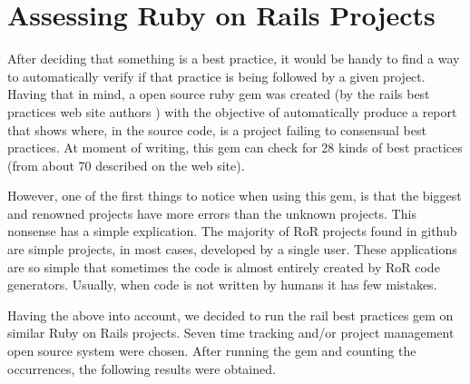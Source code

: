 \documentclass[sle]{llncs}
\begin{document}
\section{Assessing Ruby on Rails Projects}
After deciding that something is a best practice,
it would be handy to find a way to automatically verify if that practice is being followed by a given project.
Having that in mind, a open source ruby gem was created (by the rails best practices web site authors ) with the objective of automatically produce a report that shows where, 
in the source code, is a project failing to consensual best practices.
At moment of writing, this gem can check for 28 kinds of best practices (from about 70 described on the web site).

However, one of the first things to notice when using this gem,
is that the biggest and renowned projects have more errors than the unknown projects. 
This nonsense has a simple explication.
The majority of RoR projects found in github are simple projects, in most cases, developed by a single user. 
These applications are so simple that sometimes the code is almost entirely created by RoR code generators.
Usually, when code is not written by humans it has few mistakes.

Having the above into account, we decided to run the rail best practices gem on similar Ruby on Rails projects.
Seven time tracking and/or project management open source system were chosen.
After running the gem and counting the occurrences, the following results were obtained.
\end{document}
